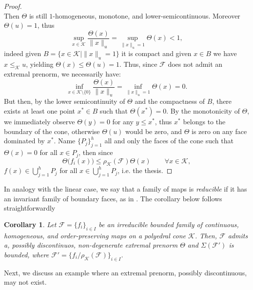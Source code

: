 \documentclass{article}
\newtheorem{corollary}[theorem]{Corollary}
\newcommand{\family}{\mathcal{F}}
\newcommand{\cradius}{\rho_{\cone}}
\newcommand{\cone}{\mathcal{K}}
\newcommand{\cleq}{\leq_{\cone}}
\begin{document}
\begin{proof}
\begin{equation}
\end{equation}
%
Then $\Theta$ is still $1$-homogeneous, monotone, and lower-semicontinuous.
%
Moreover $\Theta(u)=1$, thus 
\begin{equation}
    \sup_{x\in\cone}\frac{\Theta(x)}{\|x\|_u}=\sup_{\|x\|_u=1}\Theta(x)<1,
\end{equation}
indeed given $B=\{x\in\cone| \|x\|_u=1 \}$ it is compact and  given $x\in B$ we have $x\cleq  u$, yielding $\Theta(x)\leq \Theta(u)=1$. Thus, since $\family$ does not admit an extremal prenorm, we necessarily have:
\begin{equation}
    \inf_{x\in\cone\setminus\{0\}}\frac{\Theta(x)}{\|x\|_u}=\inf_{\|x\|_u=1}\Theta(x)=0.
\end{equation}
But then, by the lower semicontinuity of $\Theta$ and the compactness of $B$, there exists at least one point $x^*\in B$ such that $\Theta(x^*)=0$.
By the monotonicity of $\Theta$, we immediately observe $\Theta(y)=0$ for any $y\leq x^*$, thus $x^*$ belongs to the boundary of the cone, otherwise $\Theta(u)$ would be zero, and $\Theta$ is zero on any face dominated by $x^*$. Name $\{P_j\}_{j=1}^h$ all and only the faces of the cone such that $\Theta(x)=0$ for all $x\in P_j$, then since 
\begin{equation}
    \Theta\big(f_i(x)\big)\leq \cradius(\family) \Theta(x) \qquad \forall x\in\cone,
\end{equation}
$f(x)\in \bigcup_{j=1}^h P_j$ for all $x\in \bigcup_{j=1}^h P_j$, i.e. the thesis.
\end{proof}
In analogy with the linear case, we say that a family of maps is \textit{reducible} if it has an invariant family of boundary faces, as in . The corollary below follows straightforwardly
%
%
\begin{corollary}\label{Corollary_irreducibility_yields_boundedness}
    Let $\family=\{f_i\}_{i\in I}$ be an irreducible bounded family of continuous, homogeneous, and order-preserving maps on a polyedral cone $\cone$. Then, $\family$ admits a, possibly discontinuos, non-degenerate extremal prenorm $\Theta$ and $\Sigma(\family')$ is bounded, where $\family'=\{f_i/\cradius(\family)\}_{i\in I}$.
\end{corollary}
%
%

Next, we discuss an example where an extremal prenorm, possibly discontinuous, may not exist. 
\end{document}
